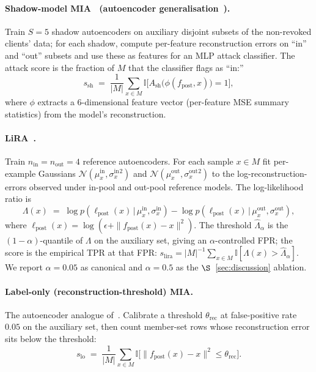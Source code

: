 \paragraph{Shadow-model MIA~\cite{shokri2017mia}
(autoencoder generalisation~\cite{hilprecht2019monte}).} Train
$S=5$ shadow autoencoders on auxiliary disjoint subsets of the
non-revoked clients' data; for each shadow, compute per-feature reconstruction errors on
``in'' and ``out'' subsets and use these as features for an MLP
attack classifier. The attack score is the fraction of $M$ that the
classifier flags as ``in:''
\begin{equation}\label{eq:shadow}
    s_{\mathrm{sh}} \;=\; \frac{1}{|M|}
    \sum_{x \in M}
    \mathbb{I}\!\big[A_{\mathrm{sh}}\big(\phi(f_{\mathrm{post}}, x)\big) = 1\big],
\end{equation}
where $\phi$ extracts a 6-dimensional feature vector
(per-feature MSE summary statistics) from the model's reconstruction.

\paragraph{LiRA~\cite{carlini2022lira}.} Train $n_{\mathrm{in}} =
n_{\mathrm{out}} = 4$ reference autoencoders. For each sample $x \in M$
fit per-example Gaussians
$\mathcal{N}(\mu^{\mathrm{in}}_x,\sigma^{\mathrm{in}}_x{}^2)$ and
$\mathcal{N}(\mu^{\mathrm{out}}_x,\sigma^{\mathrm{out}}_x{}^2)$ to
the log-reconstruction-errors observed under in-pool and out-pool
reference models. The log-likelihood ratio is
\begin{equation}\label{eq:lira}
    \Lambda(x) \;=\;
    \log p\!\left(\ell_{\mathrm{post}}(x) \,\big|\, \mu^{\mathrm{in}}_x,\sigma^{\mathrm{in}}_x\right)
    -
    \log p\!\left(\ell_{\mathrm{post}}(x) \,\big|\, \mu^{\mathrm{out}}_x,\sigma^{\mathrm{out}}_x\right),
\end{equation}
where $\ell_{\mathrm{post}}(x) = \log(\epsilon +
\|f_{\mathrm{post}}(x)\!-\!x\|^2)$. The threshold
$\hat{\Lambda}_\alpha$ is the $(1\!-\!\alpha)$-quantile of $\Lambda$
on the auxiliary set, giving an $\alpha$-controlled FPR; the score
is the empirical TPR at that FPR:
$s_{\mathrm{lira}} = |M|^{-1} \sum_{x \in M} \mathbb{I}[\Lambda(x)\!>\!
\hat{\Lambda}_\alpha]$. We report $\alpha\!=\!0.05$ as canonical and
$\alpha\!=\!0.5$ as the $\S$~\ref{sec:discussion} ablation.

\paragraph{Label-only (reconstruction-threshold) MIA.}
The autoencoder analogue of~\cite{choquettechoo2021labelonly}.
Calibrate a threshold $\theta_{\mathrm{rec}}$ at false-positive rate
$0.05$ on the auxiliary set, then count member-set rows whose
reconstruction error sits below the threshold:
\begin{equation}\label{eq:labelonly}
    s_{\mathrm{lo}} \;=\;
    \frac{1}{|M|} \sum_{x \in M}
    \mathbb{I}\!\big[
        \|f_{\mathrm{post}}(x) - x\|^2 \le \theta_{\mathrm{rec}}
    \big].
\end{equation}

